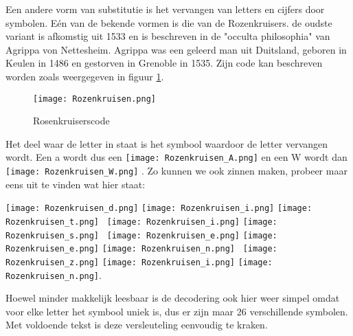 Een andere vorm van substitutie is het vervangen van letters en cijfers door symbolen. E\'en van de bekende vormen is die van de Rozenkruisers. de oudste variant is afkomstig uit 1533 en is beschreven in de "occulta philosophia" van Agrippa von Nettesheim. Agrippa was een geleerd man uit Duitsland, geboren in Keulen in 1486 en gestorven in Grenoble in 1535. Zijn code kan beschreven worden zoals weergegeven in figuur \ref{fig:rosenkruisen}.

\begin{figure}[h!]
	\centering
	\texttt{[image: Rozenkruisen.png]}
	\caption{Rosenkruiserscode}
	\label{fig:rosenkruisen}
\end{figure}

Het deel waar de letter in staat is het symbool waardoor de letter vervangen wordt. Een a wordt dus een 
\texttt{[image: Rozenkruisen\_A.png]}
en een W wordt dan 
\texttt{[image: Rozenkruisen\_W.png]}
. Zo kunnen we ook zinnen maken, probeer maar eens uit te vinden wat hier staat:


\texttt{[image: Rozenkruisen\_d.png]} \texttt{[image: Rozenkruisen\_i.png]} \texttt{[image: Rozenkruisen\_t.png]} \, \texttt{[image: Rozenkruisen\_i.png]} \texttt{[image: Rozenkruisen\_s.png]} \, \texttt{[image: Rozenkruisen\_e.png]} \texttt{[image: Rozenkruisen\_e.png]} \texttt{[image: Rozenkruisen\_n.png]} \, \texttt{[image: Rozenkruisen\_z.png]} \texttt{[image: Rozenkruisen\_i.png]} \texttt{[image: Rozenkruisen\_n.png]}.

Hoewel minder makkelijk leesbaar is de decodering ook hier weer simpel omdat voor elke letter het symbool uniek is, dus er zijn maar 26 verschillende symbolen. Met voldoende tekst is deze versleuteling eenvoudig te kraken.
